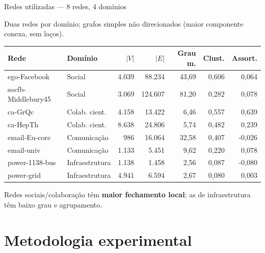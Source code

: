 \documentclass[aspectratio=169,11pt]{beamer}
\providecommand{\EspacoAposTitulo}{\vspace*{0.93cm}}
\newcommand{\dest}[1]{\textcolor{modTeal}{\textbf{#1}}}
\begin{document}
\begin{frame}[t]{Redes utilizadas — 8 redes, 4 domínios}

  \EspacoAposTitulo

  Duas redes por domínio; grafos simples não direcionados (maior
  componente conexa, sem laços).

  \vspace{0.18cm}
  {\footnotesize
  \setlength{\tabcolsep}{5pt}
  \renewcommand{\arraystretch}{1.05}
  \begin{center}
  \begin{tabular}{llrrrrr}
    \toprule
    \textbf{Rede} & \textbf{Domínio} & $|V|$ & $|E|$ &
    \textbf{Grau m.} & \textbf{Clust.} & \textbf{Assort.} \\
    \midrule
    ego-Facebook       & Social        & 4.039 & 88.234  & 43,69 & 0,606 & \phantom{-}0,064 \\
    socfb-Middlebury45 & Social        & 3.069 & 124.607 & 81,20 & 0,282 & \phantom{-}0,078 \\
    ca-GrQc            & Colab. cient. & 4.158 & 13.422  & \phantom{0}6,46 & 0,557 & \phantom{-}0,639 \\
    ca-HepTh           & Colab. cient. & 8.638 & 24.806  & \phantom{0}5,74 & 0,482 & \phantom{-}0,239 \\
    email-Eu-core      & Comunicação   & \phantom{0.}986 & 16.064 & 32,58 & 0,407 & -0,026 \\
    email-univ         & Comunicação   & 1.133 & 5.451   & \phantom{0}9,62 & 0,220 & \phantom{-}0,078 \\
    power-1138-bus     & Infraestrutura& 1.138 & 1.458   & \phantom{0}2,56 & 0,087 & -0,080 \\
    power-grid         & Infraestrutura& 4.941 & 6.594   & \phantom{0}2,67 & 0,080 & \phantom{-}0,003 \\
    \bottomrule
  \end{tabular}
  \end{center}}

  \vspace{0.12cm}
  {\scriptsize
  Redes sociais/colaboração têm \dest{maior fechamento local}; as de
  infraestrutura têm baixo grau e agrupamento.}

\end{frame}

\section{Metodologia experimental}
\end{document}
